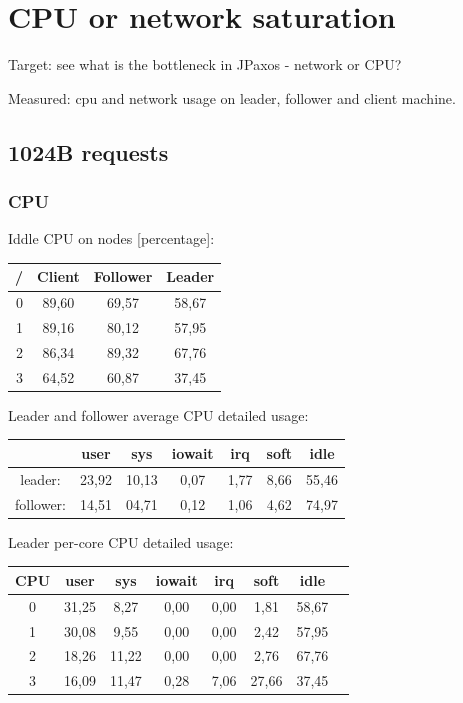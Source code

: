 

\section{CPU or network saturation}

Target: see what is the bottleneck in JPaxos - network or CPU?

Measured: cpu and network usage on leader, follower and client machine.

\subsection{1024B requests}

\subsubsection{CPU}
\strut

Iddle CPU on nodes [percentage]:\\
{\ttfamily
\begin{tabular}{|r|c|c|c|}\hline
/ & Client & Follower & Leader \\ \hline
0 & 89,60  & 69,57    & 58,67  \\ \hline
1 & 89,16  & 80,12    & 57,95  \\ \hline
2 & 86,34  & 89,32    & 67,76  \\ \hline
3 & 64,52  & 60,87    & 37,45  \\ \hline
\end{tabular}         
}

\medskip

Leader and follower average CPU detailed usage:\\
{\ttfamily
\begin{tabular}{|c|c|c|c|c|c|c|}\hline
          &  user  &   sys  & iowait & irq   & soft  & idle  \\ \hline
leader:   & 23,92  &  10,13 & 0,07   & 1,77  & 8,66  & 55,46 \\ \hline
follower: & 14,51  &  04,71 & 0,12   & 1,06  & 4,62  & 74,97 \\ \hline
\end{tabular}
}

\medskip

Leader per-core CPU detailed usage:\\
{\ttfamily
\begin{tabular}{|c|c|c|c|c|c|c|c|}\hline
CPU & user   & sys   & iowait& irq  &  soft  &  idle  \\ \hline
0   & 31,25  & 8,27  & 0,00  & 0,00 &  1,81  &  58,67 \\ \hline
1   & 30,08  & 9,55  & 0,00  & 0,00 &  2,42  &  57,95 \\ \hline
2   & 18,26  & 11,22 & 0,00  & 0,00 &  2,76  &  67,76 \\ \hline
3   & 16,09  & 11,47 & 0,28  & 7,06 &  27,66 &  37,45 \\ \hline
\end{tabular}
}

